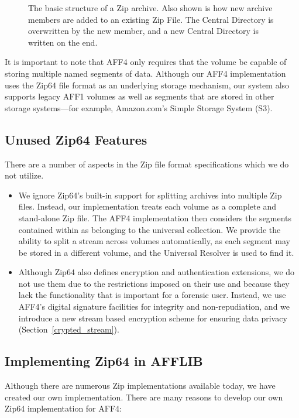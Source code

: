\documentclass[10pt, conference]{IEEEtran}
\begin{document}
\begin{figure}[tbp]
  \begin{center}
  \mbox{\columnwidth {}}

  \caption{The basic structure of a Zip archive. Also shown is how new
  archive members are added to an existing Zip File. The Central
  Directory is overwritten by the new member, and a new Central
  Directory is written on the end.  }

  \label{zip_structure}
  \end{center}
\end{figure}

It is important to note that AFF4 only requires that the volume be
capable of storing multiple named segments of data. Although our AFF4
implementation uses the Zip64 file format as an underlying storage
mechanism, our system also supports legacy AFF1 volumes as well as
segments that are stored in other storage systems---for example,
Amazon.com's Simple Storage System (S3)\cite{s3-aws-home-page-money}.

\subsection{Unused Zip64 Features}
There are a number of aspects in the Zip file format specifications
which we do not utilize.
\begin{itemize}
\item We ignore Zip64's built-in support for splitting
archives into multiple Zip files. Instead, our implementation treats
each volume as a complete and stand-alone Zip file. The AFF4
implementation then considers the segments contained within as
belonging to the universal collection. We provide the ability to split
a stream across volumes automatically, as each segment may be stored
in a different volume, and the Universal Resolver is used to find it.

\item Although Zip64 also defines encryption and authentication
extensions, we do not use them due to the restrictions imposed on
their use and because they lack the functionality that is important
for a forensic user. Instead, we use AFF4's digital signature
facilities for integrity and non-repudiation, and we introduce a new
stream based encryption scheme for ensuring data privacy
(Section~\ref{crypted_stream}).

\end{itemize}

\subsection{Implementing Zip64 in AFFLIB}
Although there are numerous Zip implementations available today, we
have created our own implementation. There are many reasons to develop
our own Zip64 implementation for AFF4:
\end{document}
